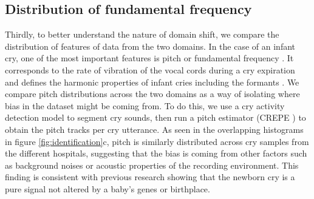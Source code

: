 \documentclass{article}
\begin{document}
\subsection{Distribution of fundamental frequency}
\label{sec:pitch-distribution}
Thirdly, to better understand the nature of domain shift, we compare the distribution of features of data from the two domains. In the case of an infant cry, one of the most important features is pitch or fundamental frequency \cite{corwin1996infant}. It corresponds to the rate of vibration of the vocal cords during a cry expiration and defines the harmonic properties of infant cries including the formants \cite{golub1985physioacoustic}. We compare pitch distributions across the two domains as a way of isolating where bias in the dataset might be coming from. To do this, we use a cry activity detection model to segment cry sounds, then run a pitch estimator (CREPE \cite{8461329}) to obtain the pitch tracks per cry utterance. As seen in the overlapping histograms in figure \ref{fig:identification}c, pitch is similarly distributed across cry samples from the different hospitals, suggesting that the bias is coming from other factors such as background noises or acoustic properties of the recording environment. This finding is consistent with previous research showing that the newborn cry is a pure signal not altered by a baby's genes or birthplace. 


\end{document}
